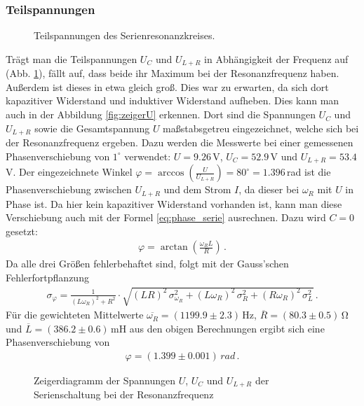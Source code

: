 \documentclass[12pt,a4paper,titlepage,headinclude,bibtotoc]{scrartcl}
\begin{document}
\subsubsection{Teilspannungen}
\begin{figure}[!htb]
	\centering
	
	\caption{Teilspannungen des Serienresonanzkreises.}
	\label{fig:teilU}
\end{figure}
Trägt man die Teilspannungen $U_C$ und $U_{L+R}$ in Abhängigkeit der Frequenz auf (Abb. \ref{fig:teilU}), fällt auf, dass beide ihr Maximum bei der Resonanzfrequenz haben.
Außerdem ist dieses in etwa gleich groß.
Dies war zu erwarten, da sich dort kapazitiver Widerstand und induktiver Widerstand aufheben.
Dies kann man auch in der Abbildung \eqref{fig:zeigerU} erkennen.
Dort sind die Spannungen $U_C$ und $U_{L+R}$ sowie die Gesamtspannung $U$ maßstabsgetreu eingezeichnet, welche sich bei der Resonanzfrequenz ergeben.
Dazu werden die Messwerte bei einer gemessenen Phasenverschiebung von $1^\circ$ verwendet: $U=9.26\,$V, $U_C=52.9\,$V und $U_{L+R}=53.4\,$V. 
Der eingezeichnete Winkel $\varphi=\arccos\left(\frac{U}{U_{L+R}}\right)=80^\circ=1.396\,$rad ist die Phasenverschiebung zwischen $U_{L+R}$ und dem Strom $I$, da dieser bei $\omega_R$ mit $U$ in Phase ist.
Da hier kein kapazitiver Widerstand vorhanden ist, kann man diese Verschiebung auch mit der Formel \eqref{eq:phase_serie} ausrechnen. Dazu wird $C=0$ gesetzt:
\begin{align}
	\varphi=\arctan\left(\frac{\omega_R L}{R}\right)\,.
\end{align}
Da alle drei Größen fehlerbehaftet sind, folgt mit der Gauss'schen Fehlerfortpflanzung
\begin{align}	
	\sigma_{\varphi}=\frac{1}{(L \omega_R)^{2} + R^{2}} \cdot \sqrt{(LR)^{2}\, \sigma_{\omega_R}^{2} + (L \omega_R)^{2}\,\sigma_{R}^{2}  + (R \omega_R)^{2}\,\sigma_{L}^{2}}\,.
\end{align}
Für die gewichteten Mittelwerte $\overline{\omega_R}=(1199.9\pm 2.3)\,\si\hertz$, $\overline{R}=(80.3 \pm 0.5)\,\si\ohm$ und $\overline{L}=(386.2 \pm 0.6)\,\si{\milli\henry}$ aus den obigen Berechnungen ergibt sich eine Phasenverschiebung von
\begin{align*}
	\varphi=(1.399 \pm 0.001)\,\si{rad}\,.
\end{align*}

\begin{figure}
	\centering	
	\caption{Zeigerdiagramm der Spannungen $U$, $U_C$ und $U_{L+R}$ der Serienschaltung bei der Resonanzfrequenz}
	\label{fig:zeigerU}
\end{figure}
\end{document}
